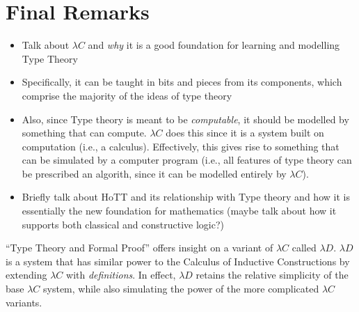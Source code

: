 \documentclass[9pt,preprint,nocopyrightspace,computermodern]{sigplanconf} %
\begin{document}
\section* {Final Remarks}
\begin{itemize}
\item Talk about \(\lambda C\) and \textit{why} it is a good foundation for
  learning and modelling Type Theory
\item Specifically, it can be taught in bits and pieces from its components,
  which comprise the majority of the ideas of type theory
\item Also, since Type theory is meant to be \textit{computable}, it should be
  modelled by something that can compute. \(\lambda C\) does this since it is a
  system built on computation (i.e., a calculus). Effectively, this gives rise to
  something that can be simulated by a computer program (i.e., all features of type
  theory can be prescribed an algorith, since it can be modelled entirely by \(\lambda C\)).
\item Briefly talk about HoTT and its relationship with Type theory and how it
  is essentially the new foundation for mathematics (maybe talk about how it supports
  both classical and constructive logic?)
\end{itemize}
``Type Theory and Formal Proof'' offers insight on a variant of \(\lambda C\) called
\(\lambda D\). \(\lambda D\) is a system that has similar power to the Calculus of
Inductive Constructions by extending \(\lambda C\) with \textit{definitions}. In effect,
\(\lambda D\) retains the relative simplicity of the base \(\lambda C\) system,
while also simulating the power of the more complicated \(\lambda C\) variants.
\end{document}
